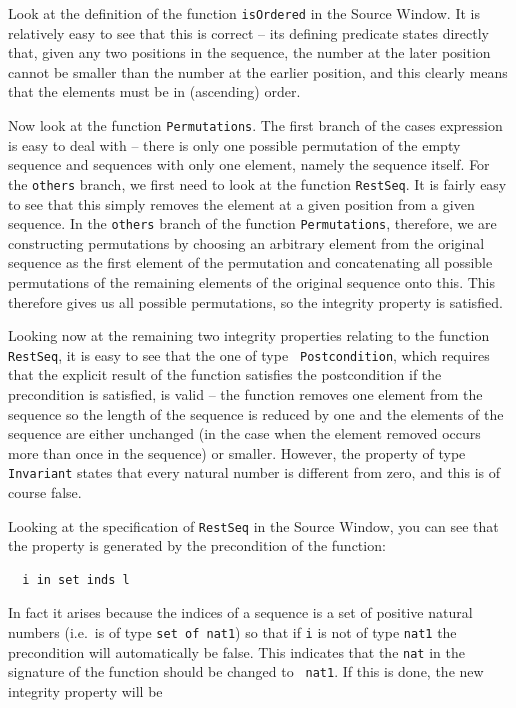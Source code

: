 \documentclass[\pformat,12pt]{article}
\newcommand{\aaa}{\tt }
\newcommand{\guicmd}[1]{{\sf #1}}
\begin{document}
Look at the definition of the function {\aaa isOrdered} in the
\guicmd{Source Window}. It is relatively easy to see that this is
correct -- its defining predicate states directly that, given any two
positions in the sequence, the number at the later position cannot be
smaller than the number at the earlier position, and this clearly
means that the elements must be in (ascending) order.

Now look at the function {\aaa Permutations}. The first branch of the
cases expression is easy 
to deal with -- there is only one possible permutation of the empty
sequence and sequences with only one element, namely the sequence
itself. For the {\aaa others} branch, we first need to look at the
function {\aaa RestSeq}. It is fairly easy to see that this simply
removes the element at a given position from a given sequence. In the
{\aaa others} branch of the function {\aaa Permutations}, therefore,
we are constructing permutations by choosing an arbitrary element from
the original sequence as the first element of the permutation and
concatenating all possible permutations of the remaining elements of
the original sequence onto this. This therefore gives us all possible
permutations, so the integrity property is satisfied.

Looking now at the remaining two integrity
properties relating to the 
function {\aaa RestSeq}, it is easy to see that the one of type {\aaa
  Postcondition}, which requires that the explicit result of the
function satisfies the postcondition if the precondition is satisfied,
is valid -- the function removes one element from the sequence so the
length of the sequence is reduced by one and the elements of the
sequence are either unchanged (in the case when the element removed
occurs more than once in the sequence) or smaller. However, the
property of type {\aaa Invariant} states that every natural number is
different from zero, and this is of course false.

Looking at the specification of {\aaa RestSeq} in the \guicmd{Source
  Window}, you can see that the property is generated by the
  precondition of the function:

\begin{verbatim}
  i in set inds l
\end{verbatim}

In fact it arises because the indices of a sequence is a set of
positive natural numbers (i.e.\ is of type 
\verb+set of nat1+) so that if {\aaa i} is not of type {\aaa nat1} the 
precondition will automatically be false. This indicates that the
{\aaa nat} in the signature of the function should be changed to {\aaa
  nat1}. If this is done, the new integrity property will be 
\end{document}
